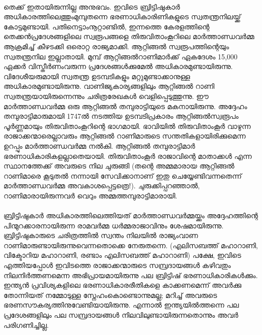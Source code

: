 \paragraph{}തെക്ക് ഇതായിരുന്നില്ല അനുഭവം. ഇവിടെ ബ്രിട്ടിഷുകാർ അധികാരത്തിലെത്തുംമുമ്പുതന്നെ ഭരണാധികാരിണികളുടെ സ്വതന്ത്രനിലയ്ക്ക് കോട്ടമുണ്ടായി. പതിനെട്ടാംനൂറ്റാണ്ടിൽ, ഇന്നത്തെ കേരളത്തിന്റെ തെക്കൻപ്രദേശങ്ങളിലെ സ്വരൂപങ്ങളെ തിരുവിതാംകൂറിലെ മാർത്താണ്ഡവർമ്മ ആക്രമിച്ച് കീഴടക്കി ഒരൊറ്റ രാജ്യമാക്കി. ആറ്റിങ്ങൽ സ്വരൂപത്തിന്റെയും സ്വതന്ത്രനില ഇല്ലാതായി. മുമ്പ് ആറ്റിങ്ങൽറാണിമാർക്ക് ഏകദേശം 15,000 ഏക്കർ വിസ്തീർണംവരുന്ന പ്രദേശങ്ങൾക്കുമേൽ അധികാരമുണ്ടായിരുന്നു. വിദേശീയരുമായി സ്വതന്ത്ര ഉടമ്പടികളും മറ്റുമുണ്ടാക്കാനുള്ള അധികാരമുണ്ടായിരുന്നു. വാണിജ്യകാര്യങ്ങളിലും ആറ്റിങ്ങൽ റാണി സ്വതന്ത്രയായിരുന്നെന്നും ചരിത്രരേഖകൾ വെളിപ്പെടുത്തുന്നു. ഈ മാർത്താണ്ഡവർമ്മ ഒരു ആറ്റിങ്ങൽ തമ്പുരാട്ടിയുടെ മകനായിരുന്നു. അദ്ദേഹം തമ്പുരാട്ടിമാരുമായി 1747ൽ നടത്തിയ ഉടമ്പടിപ്രകാരം ആറ്റിങ്ങൽസ്വരൂപം പൂർണ്ണമായും തിരുവിതാംകൂറിന്റെ ഭാഗമായി. ഭാവിയിൽ തിരുവിതാംകൂർ വാഴുന്ന രാജാക്കന്മാരെല്ലാവരും ആറ്റിങ്ങൽ റാണിമാരുടെ സന്തതികളായിരിക്കുമെന്ന ഉറപ്പും മാർത്താണ്ഡവർമ്മ നൽകി. ആറ്റിങ്ങൽ തമ്പുരാട്ടിമാർ ഭരണാധികാരികളല്ലാതെയായി. തിരുവിതാംകൂർ രാജാവിന്റെ മാതാക്കൾ എന്ന സ്ഥാനത്തേക്ക് അവരുടെ നില ചുരുങ്ങി (തന്റെ അമ്മമാരായ ആറ്റിങ്ങൽ റാണിമാരെ കൂടുതൽ നന്നായി സേവിക്കാനാണ് ഇതു ചെയ്യേണ്ടിവന്നതെന്ന് മാർത്താണ്ഡവർമ്മ അവകാശപ്പെട്ടത്രെ!). ചുരുക്കിപ്പറഞ്ഞാൽ, റാണിമാരായിരുന്നവർ വെറും അമ്മത്തമ്പുരാട്ടിമാരായി.

\paragraph{}ബ്രിട്ടിഷുകാർ അധികാരത്തിലെത്തിയത് മാർത്താണ്ഡവർമ്മയ്ക്കും അദ്ദേഹത്തിന്റെ പിന്മുറക്കാരനായിരുന്ന രാമവർമ്മ ധർമ്മരാജാവിനും ശേഷമായിരുന്നു. ബ്രിട്ടിഷുകാരുടെ ചരിത്രത്തിൽ സ്വന്തം നിലയിൽ രാജ്യംവാണ റാണിമാരുണ്ടായിരുന്നുവെന്നതൊക്കെ നേരുതന്നെ. (എലിസബത്ത് മഹാറാണി, വിക്ടോറിയ മഹാറാണി, രണ്ടാം എലിസബത്ത് മഹാറാണി) പക്ഷേ, ഇവിടെ എത്തിയപ്പോൾ ഇവിടത്തെ രാജാക്കന്മാരുടെ സമ്പ്രദായങ്ങൾ കഴിവതും നിലനിർത്തണമെന്ന അഭിപ്രായമായിരുന്നു പല ബ്രിട്ടിഷ് ഭരണാധികാരികൾക്കും. ഇന്ത്യൻ പ്രവിശ്യകളിലെ ഭരണാധികാരരീതികളെ കാക്കണമെന്ന് അവർക്കു തോന്നിയത് നമ്മോടുള്ള സ്നേഹംകൊണ്ടൊന്നുമല്ല; മറിച്ച് അവരുടെ ഭരണസൗകര്യത്തിനുവേണ്ടിയായിരുന്നു. എന്നാൽ ഇന്ത്യയിൽത്തന്നെ പല പ്രദേശങ്ങളിലും പല സമ്പ്രദായങ്ങൾ നിലവിലുണ്ടായിരുന്നതൊന്നും അവർ പരിഗണിച്ചില്ല.
